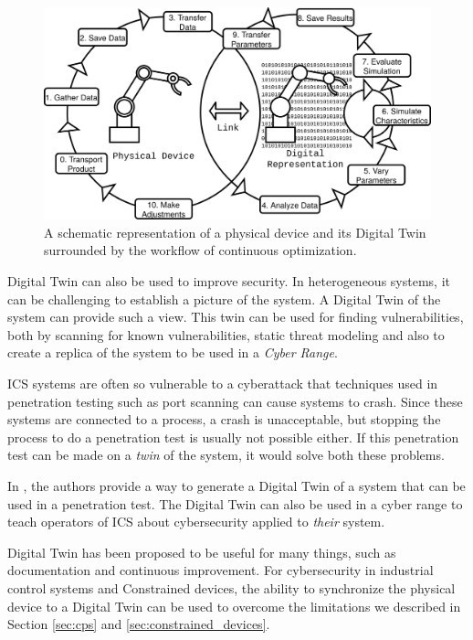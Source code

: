 \begin{figure}[ht]
\centering
\includegraphics[width=\textwidth]{images/digital_twin.png}
\caption{A schematic representation of a physical device and its Digital Twin surrounded by the workflow of continuous optimization.}
\label{fig:digital-twin}
\end{figure}

Digital Twin can also be used to improve security. In heterogeneous systems, it can be challenging to establish a picture of the system. A Digital Twin of the system can provide such a view. This twin can be used for finding vulnerabilities, both by scanning for known vulnerabilities, static threat modeling and also to create a replica of the system to be used in a \textit{Cyber Range}. 

ICS systems are often so vulnerable to a cyberattack that techniques used in penetration testing such as port scanning can cause systems to crash. Since these systems are connected to a process, a crash is unacceptable, but stopping the process to do a penetration test is usually not possible either. If this penetration test can be made on a \emph{twin} of the system, it would solve both these problems. 

In \cite{bitton2018deriving}, the authors provide a way to generate a Digital Twin of a system that can be used in a penetration test. The Digital Twin can also be used in a cyber range to teach operators of ICS about cybersecurity applied to \emph{their} system.

Digital Twin has been proposed to be useful for many things, such as documentation and continuous improvement. For cybersecurity in industrial control systems and Constrained devices, the ability to synchronize the physical device to a Digital Twin can be used to overcome the limitations we described in Section \ref{sec:cps} and \ref{sec:constrained_devices}.

